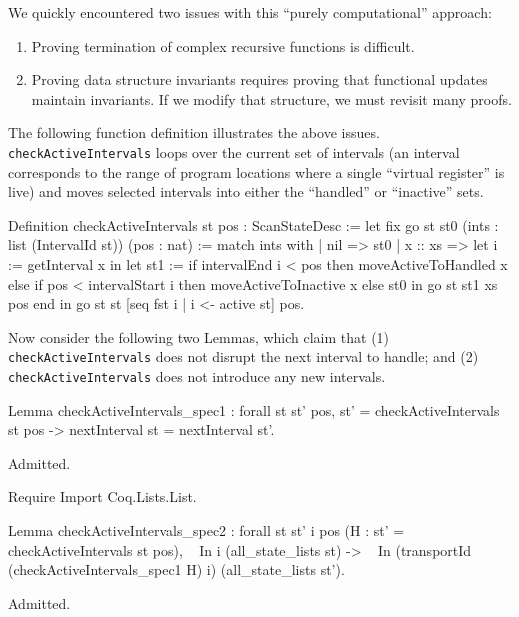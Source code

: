 \documentclass{llncs}
\newenvironment{MyCoqExampleStar}{\small \verbatim}{\endverbatim \normalsize}
\begin{document}
We quickly encountered two issues with this ``purely computational'' approach:
\begin{enumerate}
\item Proving termination of complex recursive functions is difficult.
\item Proving data structure invariants requires proving that functional
  updates maintain invariants. If we modify that structure, we must revisit
  many proofs.
\end{enumerate}
The following function definition illustrates the above
issues. \texttt{checkActiveIntervals} loops over the current set of
intervals (an interval corresponds to the range of program locations
where a single ``virtual register'' is live) and moves selected
intervals into either the ``handled'' or ``inactive'' sets.

\begin{MyCoqExampleStar}
Definition checkActiveIntervals st pos : ScanStateDesc :=
  let fix go st st0 (ints : list (IntervalId st)) (pos : nat) :=
    match ints with
    | nil => st0
    | x :: xs =>
        let i := getInterval x in
        let st1 := if intervalEnd i < pos
                   then moveActiveToHandled x
                   else if pos < intervalStart i
                        then moveActiveToInactive x
                        else st0 in
        go st st1 xs pos
    end in
  go st st [seq fst i | i <- active st] pos.
\end{MyCoqExampleStar}

Now consider the following two Lemmas, which claim that (1)
\texttt{checkActiveIntervals} does not disrupt the next interval to handle;
and (2) \texttt{checkActiveIntervals} does not introduce any new intervals.

\begin{MyCoqExampleStar}
Lemma checkActiveIntervals_spec1 : forall st st' pos,
  st' = checkActiveIntervals st pos
    -> nextInterval st = nextInterval st'.
\end{MyCoqExampleStar}
\begin{MyCoqEval}
Admitted.

Require Import Coq.Lists.List.
\end{MyCoqEval}

\begin{MyCoqExampleStar}
Lemma checkActiveIntervals_spec2 : forall st st' i pos
  (H : st' = checkActiveIntervals st pos),
  ~ In i (all_state_lists st)
    -> ~ In (transportId (checkActiveIntervals_spec1 H) i)
            (all_state_lists st').
\end{MyCoqExampleStar}
\begin{MyCoqEval}
Admitted.
\end{MyCoqEval}
\end{document}
